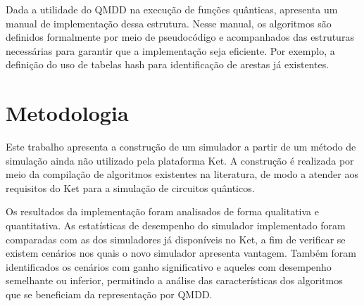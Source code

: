 Dada a utilidade do QMDD na execução de funções quânticas, \cite{kydros2025tutorial} apresenta um manual de implementação dessa estrutura. Nesse manual, os algoritmos são definidos formalmente por meio de pseudocódigo e acompanhados das estruturas necessárias para garantir que a implementação seja eficiente. Por exemplo, a definição do uso de tabelas hash para identificação de arestas já existentes. 

\section{Metodologia}

Este trabalho apresenta a construção de um simulador a partir de um método de simulação ainda não utilizado pela plataforma Ket. A construção é realizada por meio da compilação de algoritmos existentes na literatura, de modo a atender aos requisitos do Ket para a simulação de circuitos quânticos.

Os resultados da implementação foram analisados de forma qualitativa e quantitativa. As estatísticas de desempenho do simulador implementado foram comparadas com as dos simuladores já disponíveis no Ket, a fim de verificar se existem cenários nos quais o novo simulador apresenta vantagem. Também foram identificados os cenários com ganho significativo e aqueles com desempenho semelhante ou inferior, permitindo a análise das características dos algoritmos que se beneficiam da representação por QMDD.
